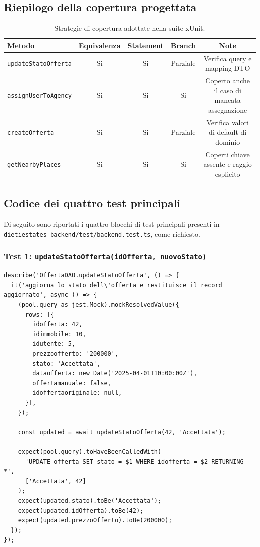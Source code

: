 \documentclass[a4paper,11pt]{article}
\begin{document}
\subsection{Riepilogo della copertura progettata}
\begin{table}[H]
\centering
\begin{tabularx}{\textwidth}{@{}l c c c c@{}}
\toprule
Metodo & Equivalenza & Statement & Branch & Note \\
\midrule
\texttt{updateStatoOfferta} & Si & Si & Parziale & Verifica query e mapping DTO \\
\texttt{assignUserToAgency} & Si & Si & Si & Coperto anche il caso di mancata assegnazione \\
\texttt{createOfferta} & Si & Si & Parziale & Verifica valori di default di dominio \\
\texttt{getNearbyPlaces} & Si & Si & Si & Coperti chiave assente e raggio esplicito \\
\bottomrule
\end{tabularx}
\caption{Strategie di copertura adottate nella suite xUnit.}
\label{tab:coverage-strategy}
\end{table}

\subsection{Codice dei quattro test principali}
Di seguito sono riportati i quattro blocchi di test principali presenti in \texttt{dietiestates-backend/test/backend.test.ts}, come richiesto.

\subsubsection{Test 1: \texttt{updateStatoOfferta(idOfferta, nuovoStato)}}
\begin{lstlisting}[style=projectcode]
describe('OffertaDAO.updateStatoOfferta', () => {
  it('aggiorna lo stato dell\'offerta e restituisce il record aggiornato', async () => {
    (pool.query as jest.Mock).mockResolvedValue({
      rows: [{
        idofferta: 42,
        idimmobile: 10,
        idutente: 5,
        prezzoofferto: '200000',
        stato: 'Accettata',
        dataofferta: new Date('2025-04-01T10:00:00Z'),
        offertamanuale: false,
        idoffertaoriginale: null,
      }],
    });

    const updated = await updateStatoOfferta(42, 'Accettata');

    expect(pool.query).toHaveBeenCalledWith(
      'UPDATE offerta SET stato = $1 WHERE idofferta = $2 RETURNING *',
      ['Accettata', 42]
    );
    expect(updated.stato).toBe('Accettata');
    expect(updated.idOfferta).toBe(42);
    expect(updated.prezzoOfferto).toBe(200000);
  });
});
\end{lstlisting}
\end{document}
